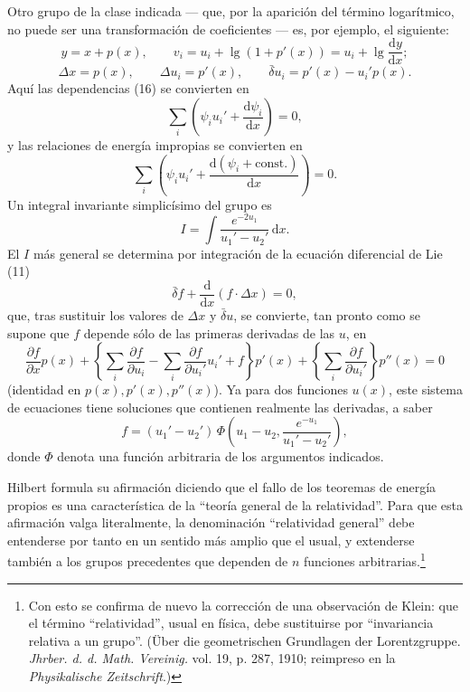 \documentclass[11pt]{article}
\newcommand{\D}{\Delta}
\providecommand{\dd}{\mathrm d}
\providecommand{\bd}{\bar{\delta}}
\providecommand{\p}{\partial}
\begin{document}
Otro grupo de la clase indicada --- que, por la aparición del término logarítmico, no puede ser una transformación de coeficientes --- es, por ejemplo, el siguiente:
\[
y=x+p(x),\qquad
v_i=u_i+\lg(1+p'(x))=u_i+\lg\frac{\dd y}{\dd x};
\]
\[
\D x=p(x),\qquad
\D u_i=p'(x),\qquad
\bd u_i=p'(x)-u_i'p(x).
\]
Aquí las dependencias (16) se convierten en
\[
\sum_i\left(\psi_i u_i'+\frac{\dd\psi_i}{\dd x}\right)=0,
\]
y las relaciones de energía impropias se convierten en
\[
\sum_i\left(\psi_i u_i'+
\frac{\dd(\psi_i+\mathrm{const.})}{\dd x}\right)=0.
\]
Un integral invariante simplicísimo del grupo es
\[
I=\int \frac{e^{-2u_1}}{u_1'-u_2'}\,\dd x.
\]
El \(I\) más general se determina por integración de la ecuación diferencial de Lie (11)
\[
\bd f+\frac{\dd}{\dd x}(f\cdot \D x)=0,
\]
que, tras sustituir los valores de \(\D x\) y \(\bd u\), se convierte, tan pronto como se supone que \(f\) depende sólo de las primeras derivadas de las \(u\), en
\[
\frac{\p f}{\p x}p(x)
+\left\{\sum_i\frac{\p f}{\p u_i}
-\sum_i\frac{\p f}{\p u_i'}u_i'+f\right\}p'(x)
+\left\{\sum_i\frac{\p f}{\p u_i'}\right\}p''(x)=0
\]
(identidad en \(p(x),p'(x),p''(x)\)). Ya para dos funciones \(u(x)\), este sistema de ecuaciones tiene soluciones que contienen realmente las derivadas, a saber
\[
f=(u_1'-u_2')\,
\Phi\!\left(u_1-u_2,\frac{e^{-u_1}}{u_1'-u_2'}\right),
\]
donde \(\Phi\) denota una función arbitraria de los argumentos indicados.

Hilbert formula su afirmación diciendo que el fallo de los teoremas de energía propios es una característica de la ``teoría general de la relatividad''. Para que esta afirmación valga literalmente, la denominación ``relatividad general'' debe entenderse por tanto en un sentido más amplio que el usual, y extenderse también a los grupos precedentes que dependen de \(n\) funciones arbitrarias.\footnote{Con esto se confirma de nuevo la corrección de una observación de Klein: que el término ``relatividad'', usual en física, debe sustituirse por ``invariancia relativa a un grupo''. (Über die geometrischen Grundlagen der Lorentzgruppe. \emph{Jhrber. d. d. Math. Vereinig.} vol. 19, p. 287, 1910; reimpreso en la \emph{Physikalische Zeitschrift}.)}

\providecommand{\p}{\partial}
\providecommand{\frS}{\mathfrak S}
\providecommand{\frp}{\mathfrak p}
\providecommand{\fra}{\mathfrak a}
\providecommand{\frb}{\mathfrak b}
\providecommand{\frc}{\mathfrak c}
\providecommand{\frf}{\mathfrak f}
\providecommand{\frr}{\mathfrak r}
\providecommand{\frm}{\mathfrak m}
\providecommand{\frD}{\mathfrak D}
\providecommand{\calA}{\mathcal A}
\providecommand{\calB}{\mathcal B}
\providecommand{\calN}{\mathcal N}
\end{document}
